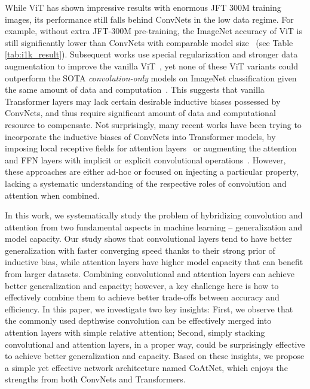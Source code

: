 \documentclass{article}
\newcommand{\name}{CoAtNet\xspace}
\begin{document}
While ViT has shown impressive results with enormous JFT 300M training images,  its performance still falls behind ConvNets in the low data regime. For example, without extra JFT-300M pre-training, the ImageNet accuracy of ViT is still significantly lower than ConvNets with comparable model size~\cite{efficientnet19} (see Table \ref{tab:i1k_result}).
Subsequent works use special regularization and stronger data augmentation to improve the vanilla ViT~\cite{touvron2020training,touvron2021going,zhou2021deepvit},
yet none of these ViT variants could outperform the SOTA \textit{convolution-only} models on ImageNet classification given the same amount of data and computation~\cite{tan2021efficientnetv2,brock2021high}.
This suggests that vanilla Transformer layers may lack certain desirable inductive biases possessed by ConvNets, and thus require significant amount of data and computational resource to compensate. Not surprisingly, many recent works have been trying to incorporate the inductive biases of ConvNets into Transformer models, by imposing local receptive fields for attention layers~\cite{vaswani2021scaling,liu2021swin} or 
augmenting the attention and FFN layers with implicit or explicit convolutional operations~\cite{wu2021cvt,graham2021levit,yuan2021tokens}.
However, these approaches are either ad-hoc or focused on injecting a particular property, lacking a systematic understanding of the respective roles of convolution and attention when combined.

In this work, we systematically study the problem of hybridizing convolution and attention from two fundamental aspects in machine learning -- generalization and model capacity.
Our study shows that convolutional layers tend to have better generalization with faster converging speed thanks to their strong prior of inductive bias, while attention layers have higher model capacity that can benefit from larger datasets.
Combining convolutional and attention layers can achieve better generalization and capacity; however, a key challenge here is how to effectively combine them to achieve better trade-offs between accuracy and efficiency.
In this paper, we investigate two key insights: First, we observe that the commonly used depthwise convolution can be effectively merged into attention layers with simple relative attention; Second, simply stacking convolutional and attention layers, in a proper way, could be surprisingly effective to achieve better generalization and capacity.
Based on these insights, we propose a simple yet effective network architecture named \name, which enjoys the strengths from both ConvNets and Transformers.
\end{document}
